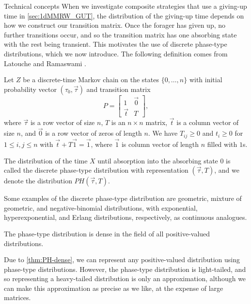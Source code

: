 \begin{section}{Technical concepts \label{sec:tc}}
When we investigate composite strategies that use a giving-up time in \cref{sec:1dMMRW_GUT}, the distribution of the giving-up time depends on how we construct our transition matrix. Once the forager has given up, no further transitions occur, and so the transition matrix has one absorbing state with the rest being transient. This motivates the use of discrete phase-type distributions, which we now introduce. The following definition comes from Latouche and Ramaswami \cite{Latouche_1999}.


\begin{definition}
	\label{def:phase-type_dist}
	Let $Z$ be a discrete-time Markov chain on the states $\{0,\dots,n\}$ with initial probability vector $(\tau_0,\vec{\tau})$ and transition matrix
	\begin{equation*}
	P = \begin{bmatrix}
	1 & \vec{0} \\ 
	\vec{t} & T
	\end{bmatrix},
	\end{equation*}
	where $\vec{\tau}$ is a row vector of size $n$, $T$ is an $n \times n$ matrix, $\vec{t}$ is a column vector of size $n$, and $\vec{0}$ is a row vector of zeros of length $n$. We have $T_{ij} \geq 0$ and $t_i \geq 0$ for $1 \leq i,j \leq n$ with $\vec{t} + T \vec{1} = \vec{1}$, where $\vec{1}$ is column vector of length $n$ filled with $1$s.
	
	The distribution of the time $X$ until absorption into the absorbing state $0$ is called the discrete phase-type distribution with representation $(\vec{\tau}, T)$, and we denote the distribution $PH(\vec{\tau},T)$.
\end{definition}

Some examples of the discrete phase-type distribution are geometric, mixture of geometric, and negative-binomial distributions, with exponential, hyperexponential, and Erlang distributions, respectively, as continuous analogues.

\begin{theorem}
	\label{thm:PH-dense}
	The phase-type distribution is dense in the field of all positive-valued distributions.
\end{theorem}

Due to \cref{thm:PH-dense}, we can represent any positive-valued distribution using phase-type distributions. However, the phase-type distribution is light-tailed, and so representing a heavy-tailed distribution is only an approximation, although we can make this approximation as precise as we like, at the expense of large matrices.


\end{section}
